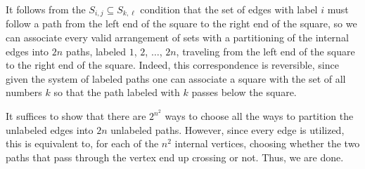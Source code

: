 It follows from the $S_{i,j} \subseteq S_{k,\ell}$ condition that the set of edges with label $i$ must follow a path from the left end of the square to the right end of the square, so we can associate every valid arrangement of sets with a partitioning of the internal edges into $2n$ paths, labeled $1$, $2$, $\ldots$, $2n$, traveling from the left end of the square to the right end of the square. Indeed, this correspondence is reversible, since given the system of labeled paths one can associate a square with the set of all numbers $k$ so that the path labeled with $k$ passes below the square.

It suffices to show that there are $2^{n^2}$ ways to choose all the ways to partition the unlabeled edges into $2n$ unlabeled paths. However, since every edge is utilized, this is equivalent to, for each of the $n^2$ internal vertices, choosing whether the two paths that pass through the vertex end up crossing or not. Thus, we are done.


